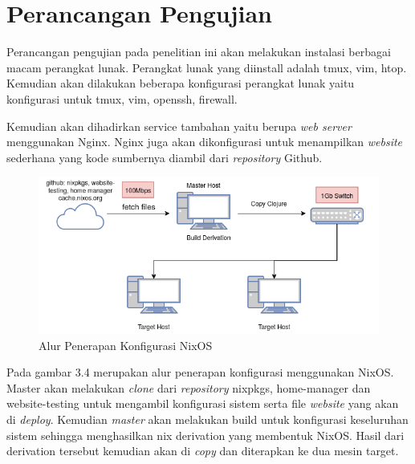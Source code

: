 \documentclass[10pt,]{report}
\begin{document}
\section{Perancangan Pengujian}
\begin{adjustwidth}{20pt}{}
	\hspace\parindent
	Perancangan pengujian pada penelitian ini akan melakukan instalasi berbagai
	macam perangkat lunak. Perangkat lunak yang diinstall adalah tmux, vim,
	htop. Kemudian akan dilakukan beberapa konfigurasi perangkat lunak
	yaitu konfigurasi untuk tmux, vim, openssh, firewall.

	Kemudian akan dihadirkan service tambahan yaitu berupa \textit{web server}
	menggunakan Nginx. Nginx juga akan dikonfigurasi untuk menampilkan
	\textit{website} sederhana yang kode sumbernya diambil dari
	\textit{repository} Github.
	\begin{figure}[H]
		\centering
		\includegraphics[width=\textwidth]{images/nixos-topology-revision.png}
		\caption{Alur Penerapan Konfigurasi NixOS}
	\end{figure}

	Pada gambar 3.4 merupakan alur penerapan konfigurasi menggunakan NixOS.
	Master akan melakukan \textit{clone} dari \textit{repository} nixpkgs,
	home-manager dan website-testing untuk mengambil konfigurasi sistem serta
	file \textit{website} yang akan di \textit{deploy}. Kemudian \textit{master}
	akan melakukan build untuk konfigurasi keseluruhan sistem sehingga
	menghasilkan nix derivation yang membentuk NixOS. Hasil dari derivation
	tersebut kemudian akan di \textit{copy} dan diterapkan ke dua mesin target.


\end{adjustwidth}
\end{document}

